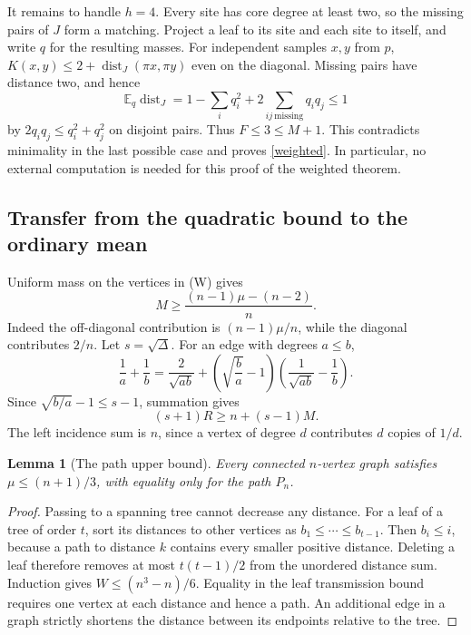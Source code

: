 \documentclass[11pt,a4paper]{article}
\newtheorem{lemma}[theorem]{Lemma}
\theoremstyle{remark}\newtheorem{remark}[theorem]{Remark}
\DeclareMathOperator{\dist}{dist}
\begin{document}
It remains to handle $h=4$. Every site has core degree at least two, so the missing pairs of $J$ form a matching. Project a leaf to its site and each site to itself, and write $q$ for the resulting masses. For independent samples $x,y$ from $p$, $K(x,y)\le2+\dist_J(\pi x,\pi y)$ even on the diagonal. Missing pairs have distance two, and hence
\[
 \mathbb E_q\dist_J
 =1-\sum_i q_i^2+2\sum_{ij\ \mathrm{missing}}q_iq_j\le1
\]
by $2q_iq_j\le q_i^2+q_j^2$ on disjoint pairs. Thus $F\le3\le M+1$. This contradicts minimality in the last possible case and proves \eqref{weighted}. In particular, no external computation is needed for this proof of the weighted theorem.


\subsection{Transfer from the quadratic bound to the ordinary mean}\label{sec:transfer}
Uniform mass on the vertices in (W) gives
\begin{equation}\label{eq:uniform}
 M\ge\frac{(n-1)\mu-(n-2)}n.
\end{equation}
Indeed the off-diagonal contribution is $(n-1)\mu/n$, while the diagonal
contributes $2/n$. Let $s=\sqrt\Delta$. For an edge with degrees $a\le b$,
\[
 \frac1a+\frac1b
 =\frac2{\sqrt{ab}}+
   \left(\sqrt{\frac ba}-1\right)
   \left(\frac1{\sqrt{ab}}-\frac1b\right).
\]
Since $\sqrt{b/a}-1\le s-1$, summation gives
\begin{equation}\label{eq:bridge}
 (s+1)R\ge n+(s-1)M.
\end{equation}
The left incidence sum is $n$, since a vertex of degree $d$ contributes
$d$ copies of $1/d$.

\begin{lemma}[The path upper bound]\label{lem:pathmean}
Every connected $n$-vertex graph satisfies $\mu\le(n+1)/3$, with equality
only for the path $P_n$.
\end{lemma}
\begin{proof}
Passing to a spanning tree cannot decrease any distance. For a leaf of
a tree of order $t$, sort its distances to other vertices as
$b_1\le\cdots\le b_{t-1}$. Then $b_i\le i$, because a path to distance
$k$ contains every smaller positive distance. Deleting a leaf therefore
removes at most $t(t-1)/2$ from the unordered distance sum. Induction gives
$W\le(n^3-n)/6$. Equality in the leaf transmission bound requires one
vertex at each distance and hence a path. An additional edge in a graph
strictly shortens the distance between its endpoints relative to the tree.
\end{proof}
\end{document}

